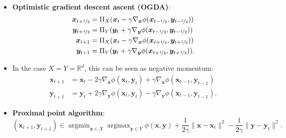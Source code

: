 \documentclass[8pt,a4paper]{extarticle}
\DeclareMathOperator*{\argmax}{argmax}
\DeclareMathOperator*{\argmin}{argmin}
\newcommand{\R}{\mathbb{R}}
\renewcommand{\vec}[1]{\bm{#1}}
\newenvironment{topic}[1]
{\textbf{\sffamily \colorbox{black}{\rlap{\textbf{\textcolor{white}{#1}}}\hspace{\linewidth}\hspace{-2\fboxsep}}} \\ \vspace{0.2cm}}
{}
\begin{document}
\begin{multicols*}{2}
\begin{topic}{Min-max optimization}
\begin{itemize}
            \item \textbf{Optimistic gradient descent ascent (OGDA)}:
                  \begin{align*}
                      \vec{x}_{t+\nicefrac{1}{2}} & = \Pi_X(\vec{x}_t - \gamma \nabla_{\vec{x}} \phi(\vec{x}_{t-\nicefrac{1}{2}}, \vec{y}_{t-\nicefrac{1}{2}}))  \\
                      \vec{y}_{t+\nicefrac{1}{2}} & = \Pi_Y(\vec{y}_t + \gamma \nabla_{\vec{y}} \phi(\vec{x}_{t-\nicefrac{1}{2}}, \vec{y}_{t-\nicefrac{1}{2}}))  \\
                      \vec{x}_{t+1}               & = \Pi_X(\vec{x}_t - \gamma \nabla_{\vec{x}} \phi(\vec{x}_{t+\nicefrac{1}{2}}, \vec{y}_{t+\nicefrac{1}{2}}))  \\
                      \vec{y}_{t+1}               & = \Pi_Y(\vec{y}_t + \gamma \nabla_{\vec{y}} \phi(\vec{x}_{t+\nicefrac{1}{2}}, \vec{y}_{t+\nicefrac{1}{2}})).
                  \end{align*}
            \item In the case $X = Y = \R^d$, this can be seen as negative momentum:
                  \begin{align*}
                      \vec{x}_{t+1} & = \vec{x}_t - 2 \gamma \nabla_{\vec{x}} \phi(\vec{x}_t, \vec{y}_t) + \gamma \nabla_{\vec{x}} \phi(\vec{x}_{t-1}, \vec{y}_{t-1})  \\
                      \vec{y}_{t+1} & = \vec{y}_t + 2 \gamma \nabla_{\vec{y}} \phi(\vec{x}_t, \vec{y}_t) - \gamma \nabla_{\vec{y}} \phi(\vec{x}_{t-1}, \vec{y}_{t-1}).
                  \end{align*}
            \item \textbf{Proximal point algorithm}: \[
                      (\vec{x}_{t+1}, \vec{y}_{t+1}) \in \argmin_{\vec{x} \in X} \argmax_{\vec{y} \in Y} \phi(\vec{x}, \vec{y}) + \frac{1}{2 \gamma} \| \vec{x} - \vec{x}_t \|^2 - \frac{1}{2 \gamma} \| \vec{y} - \vec{y}_t \|^2.
                  \]
        \end{itemize}
    \end{topic}


\end{multicols*}
\end{document}
